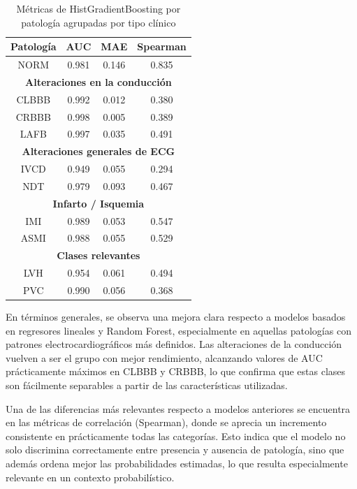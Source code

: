 \documentclass[12pt,a4paper,twoside]{book}
\begin{document}
\begin{table}[H]
	\centering
	\begin{tabular}{|c|c|c|c|}
	\hline

	\textbf{Patología} & \textbf{AUC} & \textbf{MAE} & \textbf{Spearman} \\
	\hline
	NORM & 0.981 & 0.146 & 0.835 \\
	\hline

	\multicolumn{4}{|c|}{\textbf{Alteraciones en la conducción}} \\
	\hline
	CLBBB & 0.992 & 0.012 & 0.380 \\
	CRBBB & 0.998 & 0.005 & 0.389 \\
	LAFB  & 0.997 & 0.035 & 0.491 \\
	\hline

	\multicolumn{4}{|c|}{\textbf{Alteraciones generales de ECG}} \\
	\hline
	IVCD & 0.949 & 0.055 & 0.294 \\
	NDT  & 0.979 & 0.093 & 0.467 \\
	\hline

	\multicolumn{4}{|c|}{\textbf{Infarto / Isquemia}} \\
	\hline
	IMI  & 0.989 & 0.053 & 0.547 \\
	ASMI & 0.988 & 0.055 & 0.529 \\
	\hline

	\multicolumn{4}{|c|}{\textbf{Clases relevantes}} \\
	\hline
	LVH & 0.954 & 0.061 & 0.494 \\
	PVC & 0.990 & 0.056 & 0.368 \\
	\hline

	\end{tabular}
	\caption{Métricas de HistGradientBoosting por patología agrupadas por tipo clínico}
	\label{tab:metrics_grouped_hgb}
\end{table}

En términos generales, se observa una mejora clara respecto a modelos basados en regresores lineales y Random Forest, especialmente en aquellas patologías con patrones electrocardiográficos más definidos. 
Las alteraciones de la conducción vuelven a ser el grupo con mejor rendimiento, alcanzando valores de AUC prácticamente máximos en CLBBB y CRBBB, lo que confirma que estas clases son fácilmente separables a partir de las características utilizadas.

Una de las diferencias más relevantes respecto a modelos anteriores se encuentra en las métricas de correlación (Spearman), donde se aprecia un incremento consistente en prácticamente todas las categorías. 
Esto indica que el modelo no solo discrimina correctamente entre presencia y ausencia de patología, sino que además ordena mejor las probabilidades estimadas, lo que resulta especialmente relevante en un contexto probabilístico.
\end{document}
